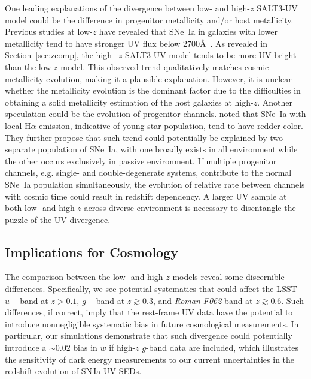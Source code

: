 \documentclass[twocolumn,tighten,times,floatfix]{aastex631}
\begin{document}
One leading explanations of the divergence between low- and high-$z$ SALT3-UV model could be the difference in progenitor metallicity and/or host metallicity. Previous studies at low-$z$ have revealed that SNe~Ia in galaxies with lower metallicity tend to have stronger UV flux below $2700$\AA\ \citep{Pan20}. As revealed in Section~\ref{sec:zcomp}, the high$-z$ SALT3-UV model tends to be more UV-bright than the low-$z$ model. This observed trend qualitatively matches cosmic metallicity evolution, making it a plausible explanation.
However, it is unclear whether the metallicity evolution is the dominant factor due to the difficulties in obtaining a solid metallicity estimation of the host galaxies at high-$z$. Another speculation could be the evolution of progenitor channels. \cite{Rigault13} noted that SNe~Ia with local H$\alpha$ emission, indicative of young star population, tend to have redder color. They further propose that such trend could potentially be explained by two separate population of SNe~Ia, with one broadly exists in all environment while the other occurs exclusively in passive environment. 
If multiple progenitor channels, e.g. single- and double-degenerate systems, contribute to the normal SNe~Ia population simultaneously, the evolution of relative rate between channels with cosmic time could result in redshift dependency. A larger UV sample at both low- and high-$z$ across diverse environment is necessary to disentangle the puzzle of the UV divergence. 



\subsection{Implications for Cosmology}



The comparison between the low- and high-$z$ models reveal some discernible differences. 
Specifically, we see potential systematics that could affect the LSST $u-$band at $z>0.1$, $g-$band at $z\gtrsim0.3$, and {\it Roman F062} band at $z\gtrsim0.6$.
Such differences, if correct, imply that the rest-frame UV data have the potential to introduce nonnegligible systematic bias in future cosmological measurements. 
In particular, our simulations demonstrate that such divergence could potentially introduce a $\sim 0.02$ bias in $w$ if high-$z$ $g$-band data are included, which illustrates the sensitivity of dark energy measurements to our current uncertainties in the redshift evolution of SN\,Ia UV SEDs.
\end{document}
